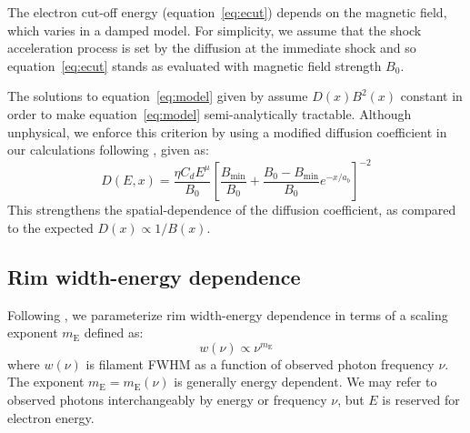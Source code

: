 \documentclass[manuscript]{aastex}  %
\newcommand*{\mt}{\mathrm}
\newcommand*{\mE}{m_\mt{E}}
\newcommand*{\Bmin}{B_{\mt{min}}}
\begin{document}
The electron cut-off energy (equation~\eqref{eq:ecut}) depends on the magnetic
field, which varies in a damped model.  For simplicity, we assume that the
shock acceleration process is set by the diffusion at the immediate shock and
so equation~\eqref{eq:ecut} stands as evaluated with magnetic field strength
$B_0$.

The solutions to equation~\eqref{eq:model} given by \citet{lerche1980,
rettig2012} assume $D(x) B^2(x)$ constant in order to make
equation~\eqref{eq:model} semi-analytically tractable.  Although unphysical, we
enforce this criterion by using a modified diffusion coefficient in our
calculations following
\citet{rettig2012}, given as:
\begin{equation} \label{eq:ddamp}
    D(E,x) = \frac{\eta C_d E^\mu}{B_0}
             \left[ \frac{\Bmin}{B_0} +
                    \frac{B_0 - \Bmin}{B_0} e^{-x/a_b} \right]^{-2}
\end{equation}
This strengthens the spatial-dependence of the diffusion coefficient, as
compared to the expected $D(x) \propto 1/B(x)$.

\subsection{Rim width-energy dependence} \label{sec:energydep}

Following , we parameterize rim width-energy dependence
in terms of a scaling exponent $\mE$ defined as:
\begin{equation}
    w(\nu) \propto \nu^{\mE}
\end{equation}
where $w(\nu)$ is filament FWHM as a function of observed photon frequency
$\nu$.  The exponent $\mE = \mE(\nu)$ is generally energy dependent.  We may
refer to observed photons interchangeably by energy or frequency $\nu$, but $E$
is reserved for electron energy.
\end{document}
